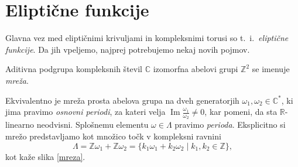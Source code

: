 \documentclass[mat1]{fmfdelo}
\numberwithin{equation}{section}
\newcommand{\R}{\mathbb R}
\newcommand{\Z}{\mathbb Z}
\newcommand{\C}{\mathbb C}
\newcommand{\CM}{\mathbb C ^*}
\newcommand{\om}{\omega}
\renewcommand\Im{\operatorname{Im}}%
\theoremstyle{definition}
\begin{document}

\section{Eliptične funkcije} \label{elipticne funkcije}

Glavna vez med eliptičnimi krivuljami in kompleksnimi torusi so t.~i.\ \emph{eliptične funkcije}. Da jih vpeljemo, najprej potrebujemo nekaj novih pojmov.

\begin{definicija}
    Aditivna podgrupa kompleksnih števil $\C$ izomorfna abelovi grupi $\Z^2$ se imenuje \emph{mreža}. 
\end{definicija}
    
Ekvivalentno je mreža prosta abelova grupa na dveh generatorjih $\omega_1, \omega_2 \in \CM$, ki jima pravimo \emph{osnovni periodi}, za kateri velja $\Im \frac{\omega_1}{\omega_2} \neq 0$, kar pomeni, da sta $\R$-linearno neodvisni. Splošnemu elementu $\omega \in \Lambda$ pravimo \emph{perioda}. Eksplicitno si mrežo predstavljamo kot množico točk v kompleksni ravnini
\[
    \Lambda = \Z\om_1 + \Z\om_2 = \{k_1 \omega_1 + k_2 \omega_2 \mid k_1, k_2 \in \Z\},  
\]
kot kaže slika \ref{mreza}.
\end{document}
